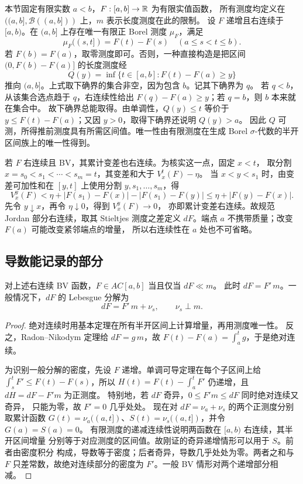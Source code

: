 本节固定有限实数 \(a<b\)，\(F:[a,b]\to\mathbb{R}\) 为有限实值函数，
所有测度均定义在 \(((a,b],\mathcal B((a,b]))\) 上，\(m\) 表示长度测度在此的限制。
设 \(F\) 递增且右连续于 \([a,b)\)。在 \((a,b]\) 上存在唯一有限正 Borel
测度 \(\mu_F\)，满足
\[
 \mu_F((s,t])=F(t)-F(s)\quad(a\le s<t\le b).
\]
若 \(F(b)=F(a)\)，取零测度即可。否则，一种直接构造是把区间
\((0,F(b)-F(a)]\) 的长度测度经
\[
 Q(y)=\inf\{t\in[a,b]:F(t)-F(a)\ge y\}
\]
推向 \((a,b]\)。上式取下确界的集合非空，因为包含 \(b\)。记其下确界为 \(q\)。
若 \(q<b\)，从该集合选点趋于 \(q\)，右连续性给出
\(F(q)-F(a)\ge y\)；若 \(q=b\)，则 \(b\) 本来就在集合中。
故下确界总能取得。由单调性，\(Q(y)\le t\) 等价于
\(y\le F(t)-F(a)\)；又因 \(y>0\)，取得下确界还说明 \(Q(y)>a\)。
因此 \(Q\) 可测，所得推前测度具有所需区间值。唯一性由有限测度在生成
Borel \(\sigma\)-代数的半开区间族上的唯一性得到。

若 \(F\) 右连续且 BV，其累计变差也右连续。为核实这一点，固定 \(x<t\)，
取分割 \(x=s_0<s_1<\cdots<s_m=t\)，其变差和大于 \(V_x^t(F)-\eta\)。
当 \(x<y<s_1\) 时，由变差可加性和在 \([y,t]\) 上使用分割
\(y,s_1,\ldots,s_m\)，得
\[
 V_x^y(F)<\eta+|F(s_1)-F(x)|-|F(s_1)-F(y)|
 \le\eta+|F(y)-F(x)|.
\]
先令 \(y\downarrow x\)，再令 \(\eta\downarrow0\)，得到 \(V_x^y(F)\to0\)，
亦即累计变差右连续。故规范 Jordan 部分右连续，取其 Stieltjes 测度之差定义
\(dF\)。端点 \(a\) 不携带质量；改变 \(F(a)\) 可能改变紧邻端点的增量，
所以右连续性在 \(a\) 处也不可省略。

\subsection{导数能记录的部分}

\begin{proposition}\label{prop:bv-measure-ac}
对上述右连续 BV 函数，\(F\in AC[a,b]\) 当且仅当 \(dF\ll m\)。
此时 \(dF=F'\,m\)。一般情况下，\(dF\) 的 Lebesgue 分解为
\[
 dF=F'\,m+\nu_s,\qquad \nu_s\perp m.
\]
\end{proposition}
\begin{proof}
绝对连续时用基本定理在所有半开区间上计算增量，再用测度唯一性。
反之，Radon--Nikodym 定理给 \(dF=g\,m\)，故
\(F(t)-F(a)=\int_a^tg\)，于是绝对连续。

为识别一般分解的密度，先设 \(F\) 递增。单调可导定理在每个子区间上给
\(\int_s^tF'\le F(t)-F(s)\)，所以
\(H(t)=F(t)-\int_a^tF'\) 仍递增，且 \(dH=dF-F'm\) 为正测度。
特别地，若 \(dF\) 奇异，\(0\le F'm\le dF\) 同时绝对连续又奇异，
只能为零，故 \(F'=0\) 几乎处处。
现在对 \(dF=\nu_a+\nu_s\) 的两个正测度分别取累计函数
\(G(t)=\nu_a((a,t])\)、\(S(t)=\nu_s((a,t])\)，并令 \(G(a)=S(a)=0\)。
有限测度的递减连续性说明两函数在 \([a,b)\) 右连续，其半开区间增量
分别等于对应测度的区间值。故刚证的奇异递增情形可以用于 \(S\)。前者由密度积分
构成，导数等于密度；后者奇异，导数几乎处处为零。两者之和与 \(F\)
只差常数，故绝对连续部分的密度为 \(F'\)。一般 BV 情形对两个递增部分相减。
\end{proof}

